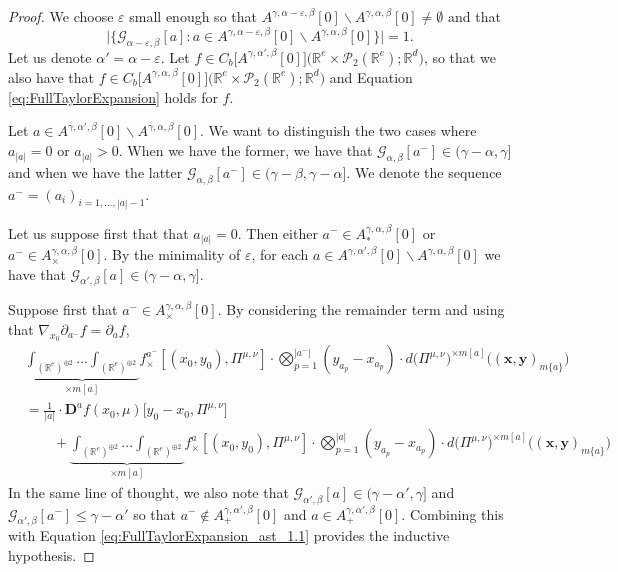 \documentclass[a4paper,11pt,twoside]{article}
\numberwithin{equation}{section}
\theoremstyle{plain}
\newcommand{\bR}{\mathbb{R}}
\newcommand{\cP}{\mathcal{P}}
\newcommand{\scG}{\mathscr{G}}
\newcommand{\rD}{\mathbf{D}}
\newcommand{\1}{\mathbbm{1}}
\begin{document}
\begin{proof}
		We choose $\varepsilon$ small enough so that $A^{\gamma, \alpha-\varepsilon, \beta}[0] \backslash A^{\gamma, \alpha, \beta}[0] \neq \emptyset$ and that 
		\begin{equation*}
			\Big| \Big\{ \scG_{\alpha - \varepsilon, \beta}[a]: a\in A^{\gamma, \alpha-\varepsilon, \beta}[0] \backslash A^{\gamma, \alpha, \beta}[0] \Big\} \Big| = 1. 
		\end{equation*}
		Let us denote $\alpha' = \alpha-\varepsilon$. Let $f\in C_b\big[ A^{\gamma, \alpha', \beta}[0] \big]\big(\bR^e \times \cP_2(\bR^e); \bR^d\big)$, so that we also have that $f\in C_b\big[ A^{\gamma, \alpha, \beta}[0] \big]\big(\bR^e \times \cP_2(\bR^e); \bR^d\big)$ and Equation \eqref{eq:FullTaylorExpansion} holds for $f$. 
		
		Let $a\in A^{\gamma, \alpha', \beta}[0] \backslash A^{\gamma, \alpha, \beta}[0]$. We want to distinguish the two cases where $a_{|a|}=0$ or $a_{|a|}>0$. When we have the former, we have that $\scG_{\alpha, \beta}[a^-] \in (\gamma-\alpha, \gamma]$ and when we have the latter $\scG_{\alpha, \beta}[a^-] \in (\gamma-\beta, \gamma-\alpha]$.  We denote the sequence $a^-=(a_i)_{i=1, ..., |a|-1}$. 
		
		Let us suppose first that that $a_{|a|} = 0$. Then either $a^-\in A_{\ast}^{\gamma, \alpha, \beta}[0]$ or $a^-\in A_{\times}^{\gamma, \alpha, \beta}[0]$. By the minimality of $\varepsilon$, for each $a\in A^{\gamma, \alpha', \beta}[0] \backslash A^{\gamma, \alpha, \beta}[0]$ we have that $\scG_{\alpha', \beta}[a]\in (\gamma-\alpha, \gamma]$. 
		
		Suppose first that $a^-\in A_{\times}^{\gamma, \alpha, \beta}[0]$. By considering the remainder term and using that $\nabla_{x_0} \partial_{a^-} f = \partial_a f$, 
		\begin{align}
			\nonumber
			&\underbrace{ \int_{(\bR^e)^{\oplus 2}} ... \int_{(\bR^e)^{\oplus 2}} }_{\times m[a]} f_{\times}^{a^-}[ (x_0, y_0), \Pi^{\mu, \nu}] 
			\cdot 
			\bigotimes_{p=1}^{|a^-|} ( y_{a_p} - x_{a_p}) \cdot d\big( \Pi^{\mu, \nu}\big)^{\times m[a]} \Big( (\boldsymbol{x}, \boldsymbol{y})_{m\{a\} }\Big)
			\\
			\nonumber
			&= \frac{1}{|a|} \cdot \rD^a f(x_0, \mu)\big[ y_0- x_0, \Pi^{\mu, \nu} \big] 
			\\
			\label{eq:FullTaylorExpansion_ast_1.1}
			&\qquad + \underbrace{ \int_{(\bR^e)^{\oplus 2}} ... \int_{(\bR^e)^{\oplus 2}} }_{\times m[a]} f_{\times}^{a}[ (x_0, y_0), \Pi^{\mu, \nu}] 
			\cdot 
			\bigotimes_{p=1}^{|a|} ( y_{a_p} - x_{a_p}) \cdot d\big( \Pi^{\mu, \nu}\big)^{\times m[a]} \Big( (\boldsymbol{x}, \boldsymbol{y})_{m\{a\} }\Big)
		\end{align}
		In the same line of thought, we also note that $\scG_{\alpha', \beta}[a] \in (\gamma-\alpha', \gamma]$ and $\scG_{\alpha', \beta}[a^-]\leq \gamma-\alpha'$ so that $a^{-} \notin A_{+}^{\gamma, \alpha', \beta}[0]$ and $a\in A_{+}^{\gamma, \alpha', \beta}[0]$. Combining this with Equation \eqref{eq:FullTaylorExpansion_ast_1.1} provides the inductive hypothesis. 
		

\end{proof}
\end{document}
